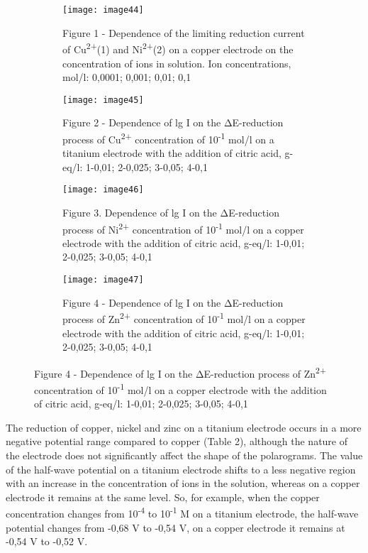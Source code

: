 \begin{figure}[H]
    \centering
    \begin{subfigure}[b]{0.45\textwidth}
        \centering
        \texttt{[image: image44]}
        \caption*{Figure 1 - Dependence of the limiting reduction current of
        Cu\textsuperscript{2+}(1) and Ni\textsuperscript{2+}(2) on a copper
        electrode on the concentration of ions in solution. Ion concentrations,
        mol/l: 0,0001; 0,001; 0,01; 0,1}
    \end{subfigure}
    \begin{subfigure}[b]{0.45\textwidth}
        \centering
        \texttt{[image: image45]}
        \caption*{Figure 2 - Dependence of lg I on the ΔE-reduction process of
        Cu\textsuperscript{2+} concentration of 10\textsuperscript{-1} mol/l on
        a titanium electrode with the addition of citric acid, g-eq/l: 1-0,01;
        2-0,025; 3-0,05; 4-0,1}
    \end{subfigure}
    \hfill
    \begin{subfigure}[b]{0.45\textwidth}
        \centering
        \texttt{[image: image46]}
        \caption*{Figure 3. Dependence of lg I on the ΔE-reduction process of
        Ni\textsuperscript{2+} concentration of 10\textsuperscript{-1} mol/l on
        a copper electrode with the addition of citric acid, g-eq/l: 1-0,01;
        2-0,025; 3-0,05; 4-0,1}
    \end{subfigure}
    \begin{subfigure}[b]{0.45\textwidth}
        \centering
        \texttt{[image: image47]}
        \caption*{Figure 4 - Dependence of lg I on the ΔE-reduction process of
        Zn\textsuperscript{2+} concentration of 10\textsuperscript{-1} mol/l on
        a copper electrode with the addition of citric acid, g-eq/l: 1-0,01;
        2-0,025; 3-0,05; 4-0,1}
    \end{subfigure}
\end{figure}

\begin{multicols}{2}
The reduction of copper, nickel and zinc on a titanium electrode occurs
in a more negative potential range compared to copper (Table 2),
although the nature of the electrode does not significantly affect the
shape of the polarograms. The value of the half-wave potential on a
titanium electrode shifts to a less negative region with an increase in
the concentration of ions in the solution, whereas on a copper electrode
it remains at the same level. So, for example, when the copper
concentration changes from 10\textsuperscript{-4} to
10\textsuperscript{-1} M on a titanium electrode, the half-wave
potential changes from -0,68 V to -0,54 V, on a copper electrode it
remains at -0,54 V to -0,52 V.
\end{multicols}

